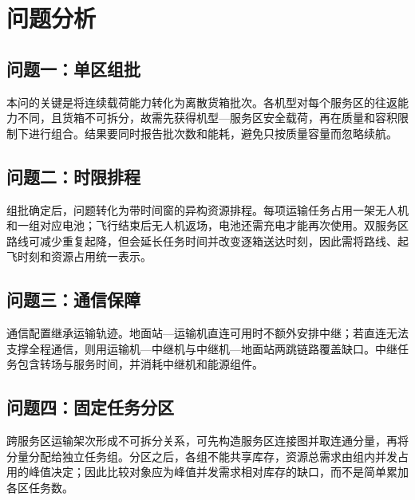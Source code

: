 \section{问题分析}
\subsection{问题一：单区组批}
本问的关键是将连续载荷能力转化为离散货箱批次。各机型对每个服务区的往返能力不同，且货箱不可拆分，故需先获得机型—服务区安全载荷，再在质量和容积限制下进行组合。结果要同时报告批次数和能耗，避免只按质量容量而忽略续航。

\subsection{问题二：时限排程}
组批确定后，问题转化为带时间窗的异构资源排程。每项运输任务占用一架无人机和一组对应电池；飞行结束后无人机返场，电池还需充电才能再次使用。双服务区路线可减少重复起降，但会延长任务时间并改变逐箱送达时刻，因此需将路线、起飞时刻和资源占用统一表示。

\subsection{问题三：通信保障}
通信配置继承运输轨迹。地面站—运输机直连可用时不额外安排中继；若直连无法支撑全程通信，则用运输机—中继机与中继机—地面站两跳链路覆盖缺口。中继任务包含转场与服务时间，并消耗中继机和能源组件。

\subsection{问题四：固定任务分区}
跨服务区运输架次形成不可拆分关系，可先构造服务区连接图并取连通分量，再将分量分配给独立任务组。分区之后，各组不能共享库存，资源总需求由组内并发占用的峰值决定；因此比较对象应为峰值并发需求相对库存的缺口，而不是简单累加各区任务数。
